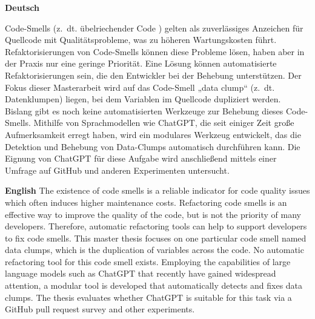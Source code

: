 \textbf{Deutsch}

Code-Smells (z.~dt. übelriechender Code ) gelten als zuverlässiges Anzeichen für Quellcode mit Qualitätsprobleme, was zu höheren Wartungskosten führt. Refaktorisierungen von Code-Smells können diese Probleme lösen, haben aber in der Praxis nur eine geringe Priorität. Eine Lösung können automatisierte Refaktorisierungen sein, die den Entwickler bei der Behebung unterstützen. Der Fokus dieser Masterarbeit wird auf das Code-Smell „data clump“ (z.~dt. Datenklumpen) liegen, bei dem Variablen im Quellcode dupliziert werden. Bislang gibt es noch keine automatisierten Werkzeuge zur Behebung dieses Code-Smells. Mithilfe von Sprachmodellen wie ChatGPT, die  seit einiger Zeit große Aufmerksamkeit erregt haben,  wird ein modulares Werkzeug entwickelt, das die Detektion und Behebung von Data-Clumps automatisch durchführen kann.  Die Eignung von ChatGPT für diese Aufgabe wird  anschließend mittels einer Umfrage auf GitHub und anderen Experimenten untersucht. 
\bigskip

\noindent
\textbf{English} 
The existence of code smells is a reliable indicator for code quality issues which often induces higher maintenance costs. Refactoring code smells is an effective way to improve the quality of the code, but is not the priority of many developers.  Therefore, automatic refactoring tools can help to support developers to fix code smells. This master thesis focuses on one particular code  smell named data clumps, which is the duplication of variables across the code. No automatic refactoring tool for this code smell exists. Employing the capabilities of large language models such as ChatGPT that  recently have gained widespread attention, a modular tool is developed  that automatically detects and fixes data clumps. The thesis evaluates whether ChatGPT is suitable for this task via a GitHub pull request survey and other experiments. 

